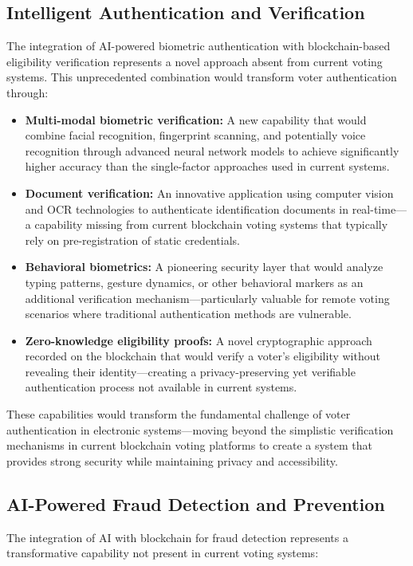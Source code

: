 \documentclass[conference]{IEEEtran}
\begin{document}
\subsection{Intelligent Authentication and Verification}
The integration of AI-powered biometric authentication with blockchain-based eligibility verification represents a novel approach absent from current voting systems. This unprecedented combination would transform voter authentication through:

\begin{itemize}
    \item \textbf{Multi-modal biometric verification:} A new capability that would combine facial recognition, fingerprint scanning, and potentially voice recognition through advanced neural network models to achieve significantly higher accuracy than the single-factor approaches used in current systems.
    
    \item \textbf{Document verification:} An innovative application using computer vision and OCR technologies to authenticate identification documents in real-time—a capability missing from current blockchain voting systems that typically rely on pre-registration of static credentials.
    
    \item \textbf{Behavioral biometrics:} A pioneering security layer that would analyze typing patterns, gesture dynamics, or other behavioral markers as an additional verification mechanism—particularly valuable for remote voting scenarios where traditional authentication methods are vulnerable.
    
    \item \textbf{Zero-knowledge eligibility proofs:} A novel cryptographic approach recorded on the blockchain that would verify a voter's eligibility without revealing their identity—creating a privacy-preserving yet verifiable authentication process not available in current systems.
\end{itemize}

These capabilities would transform the fundamental challenge of voter authentication in electronic systems—moving beyond the simplistic verification mechanisms in current blockchain voting platforms to create a system that provides strong security while maintaining privacy and accessibility.

\subsection{AI-Powered Fraud Detection and Prevention}
The integration of AI with blockchain for fraud detection represents a transformative capability not present in current voting systems:
\end{document}
